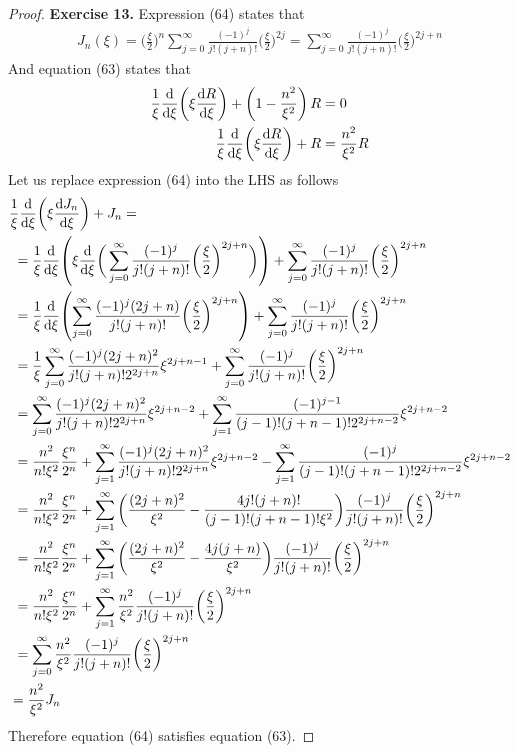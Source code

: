 \documentclass[11pt]{article}
\theoremstyle{definition}
\begin{document}
\cleardoublepage
\begin{proof}{\textbf{Exercise 13.}}
Expression (64) states that
\begin{align*}
    J_n(\xi)
    = \bigg(\frac{\xi}{2}\bigg)^n \sum_{j=0}^\infty \frac{(-1)^j}{j!(j + n)!}
    \bigg(\frac{\xi}{2}\bigg)^{2j}
    = \sum_{j=0}^\infty \frac{(-1)^j}{j!(j + n)!} \bigg(\frac{\xi}{2}\bigg)^{2j + n}
\end{align*}
And equation (63) states that
\begin{align*}
    \frac{1}{\xi}\dv{\xi}(\xi\dv{R}{\xi}) + \left(1 - \frac{n^2}{\xi^2}\right)R &= 0\\
    \frac{1}{\xi}\dv{\xi}(\xi\dv{R}{\xi}) + R &= \frac{n^2}{\xi^2}R
\end{align*}
Let us replace expression (64) into the LHS as follows
\begin{align*}
    &\frac{1}{\xi}\dv{\xi}(\xi\dv{J_n}{\xi}) + J_n =\\
    &~= \frac{1}{\xi}\dv{\xi}(
        \xi \dv{\xi}\bigg(\sum_{j=0}^\infty \frac{(-1)^j}{j!(j + n)!}
        \bigg(\frac{\xi}{2}\bigg)^{2j + n}\bigg)
    )
    + \sum_{j=0}^\infty
    \frac{(-1)^j}{j!(j + n)!} \bigg(\frac{\xi}{2}\bigg)^{2j + n}\\
    &~= \frac{1}{\xi}\dv{\xi}(
        \sum_{j=0}^\infty \frac{(-1)^j(2j + n)}{j!(j + n)!}
        \bigg(\frac{\xi}{2}\bigg)^{2j + n}
    )
    + \sum_{j=0}^\infty
    \frac{(-1)^j}{j!(j + n)!} \bigg(\frac{\xi}{2}\bigg)^{2j + n}\\
    &~= \frac{1}{\xi}
    \sum_{j=0}^\infty \frac{(-1)^j(2j + n)^2}{j!(j + n)!2^{2j + n}}\xi^{2j + n - 1}
    + \sum_{j=0}^\infty\frac{(-1)^j}{j!(j + n)!} \bigg(\frac{\xi}{2}\bigg)^{2j + n}\\
    &~=
    \sum_{j=0}^\infty \frac{(-1)^j(2j + n)^2}{j!(j + n)!2^{2j + n}}\xi^{2j + n - 2}
    + \sum_{j=1}^\infty\frac{(-1)^{j-1}}{(j - 1)!(j + n - 1)!2^{2j + n - 2}}\xi^{2j + n -2}\\
    &~=
    \frac{n^2}{n!\xi^2}\frac{\xi^{n}}{2^n}
    + \sum_{j=1}^\infty \frac{(-1)^j(2j + n)^2}{j!(j + n)!2^{2j + n}}\xi^{2j + n - 2}
    - \sum_{j=1}^\infty\frac{(-1)^j}{(j - 1)!(j + n - 1)!2^{2j + n - 2}}\xi^{2j + n -2}\\
    &~=
    \frac{n^2}{n!\xi^2}\frac{\xi^{n}}{2^n}
    + \sum_{j=1}^\infty
    \bigg(\frac{(2j + n)^2}{\xi^2} - \frac{4j!(j + n)!}{(j -1)!(j + n -1)!\xi^2}\bigg)
    \frac{(-1)^j}{j!(j + n)!} \bigg(\frac{\xi}{2}\bigg)^{2j + n}\\
    &~=
    \frac{n^2}{n!\xi^2}\frac{\xi^{n}}{2^n}
    + \sum_{j=1}^\infty
    \bigg(\frac{(2j + n)^2}{\xi^2} - \frac{4j(j + n)}{\xi^2}\bigg)
    \frac{(-1)^j}{j!(j + n)!} \bigg(\frac{\xi}{2}\bigg)^{2j + n}\\
    &~=
    \frac{n^2}{n!\xi^2}\frac{\xi^{n}}{2^n}
    + \sum_{j=1}^\infty \frac{n^2}{\xi^2}
    \frac{(-1)^j}{j!(j + n)!} \bigg(\frac{\xi}{2}\bigg)^{2j + n}\\
    &~= \sum_{j=0}^\infty \frac{n^2}{\xi^2}
    \frac{(-1)^j}{j!(j + n)!} \bigg(\frac{\xi}{2}\bigg)^{2j + n}\\
    &= \frac{n^2}{\xi^2}J_n
\end{align*}
Therefore equation (64) satisfies equation (63).
\end{proof}
\end{document}
